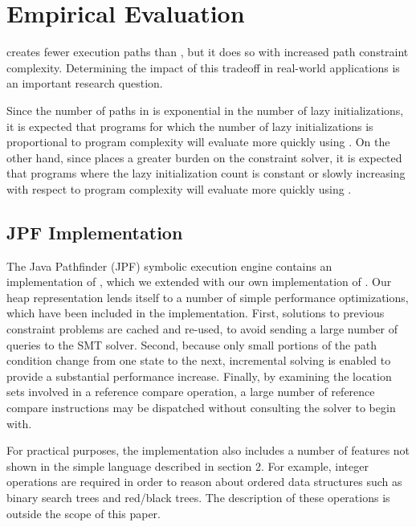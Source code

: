 \section{Empirical Evaluation}
\symtxt{} creates fewer execution paths than \gsetxt{}, but it does so with increased path constraint complexity. Determining the impact of this tradeoff in real-world applications is an important research question. 

Since the number of paths in \gsetxt{} is exponential in the number of lazy initializations, it is expected that programs for which the number of lazy initializations is proportional to program complexity will evaluate more quickly using \symtxt{}. On the other hand, since \symtxt{} places a greater burden on the constraint solver, it is expected that programs where the lazy initialization count is constant or slowly increasing with respect to program complexity will evaluate more quickly using \symtxt{}.

\subsection{JPF Implementation}
The Java Pathfinder (JPF) symbolic execution engine contains an implementation of \gsetxt{}, which we extended with our own implementation of \symtxt{}. Our heap representation lends itself to a number of simple performance optimizations, which have been included in the implementation. First, solutions to previous constraint problems are cached and re-used, to avoid sending a large number of queries to the SMT solver. Second, because only small portions of the path condition change from one state to the next, incremental solving is enabled to provide a substantial performance increase. Finally, by examining the location sets involved in a reference compare operation, a large number of reference compare instructions may be dispatched without consulting the solver to begin with. 

For practical purposes, the implementation also includes a number of features not shown in the simple language described in section 2. For example, integer operations are required in order to reason about ordered data structures such as binary search trees and red/black trees. The description of these operations is outside the scope of this paper.

